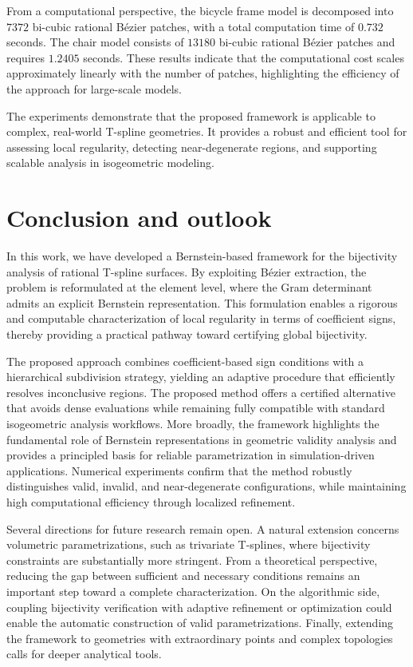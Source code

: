 \documentclass{jssc}
\begin{document}
From a computational perspective, the bicycle frame model is decomposed into $7372$ bi-cubic rational B\'ezier patches, with a total computation time of $0.732$ seconds. The chair model consists of $13180$ bi-cubic rational B\'ezier patches and requires $1.2405$ seconds. These results indicate that the computational cost scales approximately linearly with the number of patches, highlighting the efficiency of the approach for large-scale models.

The experiments demonstrate that the proposed framework is applicable to complex, real-world T-spline geometries. It provides a robust and efficient tool for assessing local regularity, detecting near-degenerate regions, and supporting scalable analysis in isogeometric modeling.

\section{Conclusion and outlook}
\label{sec:conclusion}

In this work, we have developed a Bernstein-based framework for the bijectivity analysis of rational T-spline surfaces. By exploiting B\'ezier extraction, the problem is reformulated at the element level, where the Gram determinant admits an explicit Bernstein representation. This formulation enables a rigorous and computable characterization of local regularity in terms of coefficient signs, thereby providing a practical pathway toward certifying global bijectivity.

The proposed approach combines coefficient-based sign conditions with a hierarchical subdivision strategy, yielding an adaptive procedure that efficiently resolves inconclusive regions. The proposed method offers a certified alternative that avoids dense evaluations while remaining fully compatible with standard isogeometric analysis workflows. More broadly, the framework highlights the fundamental role of Bernstein representations in geometric validity analysis and provides a principled basis for reliable parametrization in simulation-driven applications. Numerical experiments confirm that the method robustly distinguishes valid, invalid, and near-degenerate configurations, while maintaining high computational efficiency through localized refinement.

Several directions for future research remain open. A natural extension concerns volumetric parametrizations, such as trivariate T-splines, where bijectivity constraints are substantially more stringent. From a theoretical perspective, reducing the gap between sufficient and necessary conditions remains an important step toward a complete characterization. On the algorithmic side, coupling bijectivity verification with adaptive refinement or optimization could enable the automatic construction of valid parametrizations. Finally, extending the framework to geometries with extraordinary points and complex topologies calls for deeper analytical tools.
\end{document}
